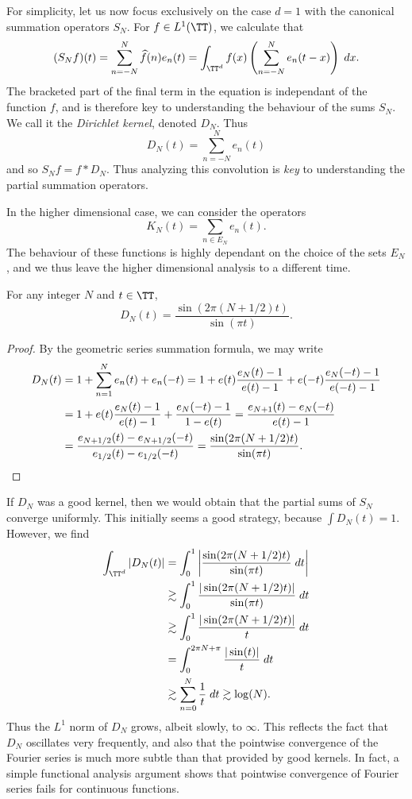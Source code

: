 For simplicity, let us now focus exclusively on the case $d = 1$ with the canonical summation operators $S_N$. For $f \in L^1(\TT)$, we calculate that
%
\[ (S_Nf)(t) = \sum_{n = -N}^N \widehat{f}(n) e_n(t) = \int_{\TT^d} f(x) \left( \sum_{n = -N}^N e_n(t - x) \right)\; dx.  \]
%
The bracketed part of the final term in the equation is independant of the function $f$, and is therefore key to understanding the behaviour of the sums $S_N$. We call it the \emph{Dirichlet kernel}, denoted $D_N$. Thus
%
\[ D_N(t) = \sum_{n = -N}^N e_n(t) \]
%
and so $S_N f = f * D_N$. Thus analyzing this convolution is \emph{key} to understanding the partial summation operators.

\begin{remark}
    In the higher dimensional case, we can consider the operators
    \[ K_N(t) = \sum_{n \in E_N} e_n(t). \]
    The behaviour of these functions is highly dependant on the choice of the sets $E_N$, and we thus leave the higher dimensional analysis to a different time.
\end{remark}

\begin{theorem}
    For any integer $N$ and $t \in \TT$,
    \[ D_N(t) = \frac{\sin(2\pi(N+1/2)t)}{\sin(\pi t)}. \]
\end{theorem}
\begin{proof}
    By the geometric series summation formula, we may write
    \begin{align*}
        D_N(t) &= 1 + \sum_{n = 1}^N e_n(t) + e_n(-t) = 1 + e(t) \frac{e_N(t) - 1}{e(t) - 1} + e(-t) \frac{e_N(-t) - 1}{e(-t) - 1}\\
        &= 1 + e(t) \frac{e_N(t) - 1}{e(t) - 1} + \frac{e_N(-t) - 1}{1 - e(t)} = \frac{e_{N+1}(t) - e_N(-t)}{e(t) - 1}\\
        &= \frac{e_{N+1/2}(t) - e_{N+1/2}(-t)}{e_{1/2}(t) - e_{1/2}(-t)} = \frac{\sin(2 \pi (N + 1/2)t)}{\sin(\pi t)}. \qedhere
    \end{align*}
\end{proof}

If $D_N$ was a good kernel, then we would obtain that the partial sums of $S_N$ converge uniformly. This initially seems a good strategy, because $\int D_N(t) = 1$. However, we find
%
\begin{align*}
    \int_{\TT^d} |D_N(t)| &= \int_0^1 \left| \frac{\sin(2 \pi (N + 1/2)t)}{\sin(\pi t)}\; dt \right|\\
    &\gtrsim \int_0^1 \frac{|\sin(2 \pi (N+1/2) t)|}{\sin(\pi t)}\; dt\\
    &\gtrsim \int_0^1 \frac{|\sin(2 \pi (N+1/2) t)|}{t}\; dt\\
    &= \int_0^{2 \pi N + \pi} \frac{|\sin(t)|}{t}\; dt\\
    &\gtrsim \sum_{n = 0}^N \frac{1}{t}\; dt \gtrsim \log(N).
\end{align*}
%
Thus the $L^1$ norm of $D_N$ grows, albeit slowly, to $\infty$. This reflects the fact that $D_N$ oscillates very frequently, and also that the pointwise convergence of the Fourier series is much more subtle than that provided by good kernels. In fact, a simple functional analysis argument shows that pointwise convergence of Fourier series fails for continuous functions.

